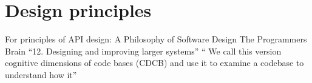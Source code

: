 






\section{Design principles}


For principles of API design:
A Philosophy of Software Design \cite{ousterhout2018philosophy}
The Programmers Brain \cite{hermans2021programmer}
“12. Designing and improving larger systems”
“ We call this version cognitive dimensions of code bases (CDCB) and use it to examine a codebase to understand how it”
\cite{kleppmann2017designing}
